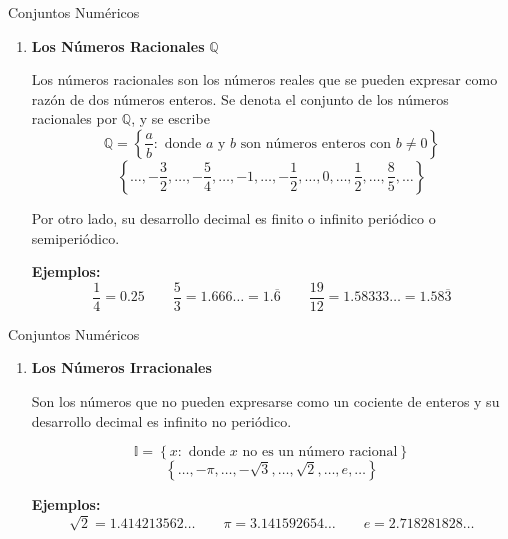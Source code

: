 \documentclass[handout,10pt]{beamer}
\begin{document}
	\begin{frame}{Conjuntos Numéricos}
		\begin{block}{}
			\begin{enumerate}
				\item[3.] \textbf{Los Números Racionales} $\mathbb{Q}$
				
				Los números racionales son los números reales que se pueden expresar como razón de dos números enteros. Se denota el conjunto de los números racionales por $\mathbb{Q}$, y se escribe
				\[
				\mathbb{Q}=
				\left\{
				\frac{a}{b}:\text{ donde } a \text{ y } b \text{ son números enteros con } b\neq 0
				\right\}
				\]
				\[
				\left\{
				\ldots,-\frac{3}{2},\ldots,-\frac{5}{4},\ldots,-1,\ldots,-\frac{1}{2},\ldots,0,\ldots,\frac{1}{2},\ldots,\frac{8}{5},\ldots
				\right\}
				\]
				
				Por otro lado, su desarrollo decimal es finito o infinito periódico o semiperiódico.
				
				\textbf{Ejemplos:}
				\[
				\frac{1}{4}=0.25
				\qquad
				\frac{5}{3}=1.666\ldots = 1.\overline{6}
				\qquad
				\frac{19}{12}=1.58333\ldots = 1.58\overline{3}
				\]
			\end{enumerate}
		\end{block}
	\end{frame}
	
	\begin{frame}{Conjuntos Numéricos}
		\begin{block}{}
			\begin{enumerate}
				\item[4.] \textbf{Los Números Irracionales}
				
				Son los números que no pueden expresarse como un cociente de enteros y su desarrollo decimal es infinito no periódico.
				
				\[
				\mathbb{I}=
				\left\{
				x:\text{ donde } x \text{ no es un número racional}
				\right\}
				\]
				\[
				\left\{
				\ldots,-\pi,\ldots,-\sqrt{3},\ldots,\sqrt{2},\ldots,e,\ldots
				\right\}
				\]
				
				\textbf{Ejemplos:}
				\[
				\sqrt{2}=1.414213562\ldots
				\qquad
				\pi=3.141592654\ldots
				\qquad
				e=2.718281828\ldots
				\]
			\end{enumerate}
		\end{block}
	\end{frame}
	
\end{document}
